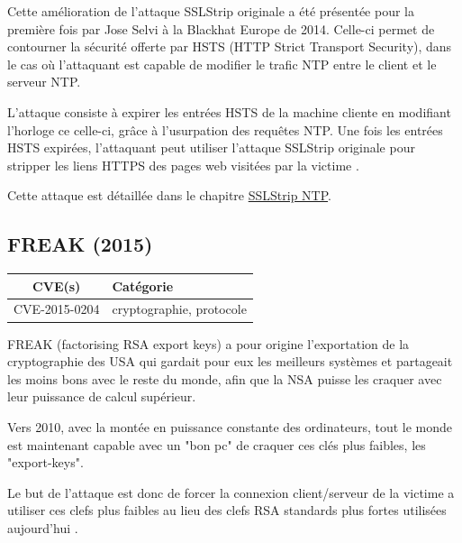 \vspace{1em}

Cette amélioration de l'attaque SSLStrip originale a été présentée pour la première fois par Jose Selvi à la Blackhat Europe de 2014. Celle-ci permet de contourner la sécurité offerte par HSTS (HTTP Strict Transport Security), dans le cas où l'attaquant est capable de modifier le trafic NTP entre le client et le serveur NTP.

L'attaque consiste à expirer les entrées HSTS de la machine cliente en modifiant l'horloge ce celle-ci, grâce à l'usurpation des requêtes NTP. Une fois les entrées HSTS expirées, l'attaquant peut utiliser l'attaque SSLStrip originale pour stripper les liens HTTPS des pages web visitées par la victime \cite{sslstrip-ntp}.

Cette attaque est détaillée dans le chapitre \hyperref[sec:sslstrip-ntp]{SSLStrip NTP}.


\subsection{FREAK (2015)}

\begin{tabularx}{0.96\textwidth}{|c|X|}
  \hline
  \textbf{CVE(s)} & \textbf{Catégorie} \\
  \hline
  CVE-2015-0204 & cryptographie, protocole \\
  \hline
\end{tabularx}

\vspace{1em}

FREAK (factorising RSA export keys) a pour origine l'exportation de la cryptographie des USA qui gardait pour eux les meilleurs systèmes et partageait les moins bons avec le reste du monde, afin que la NSA puisse les craquer avec leur puissance de calcul supérieur.

Vers 2010, avec la montée en puissance constante des ordinateurs, tout le monde est maintenant capable avec un "bon pc" de craquer ces clés plus faibles, les "export-keys".

Le but de l'attaque est donc de forcer la connexion client/serveur de la victime a utiliser ces clefs plus faibles au lieu des clefs RSA standards plus fortes utilisées aujourd'hui \cite{freak}.


